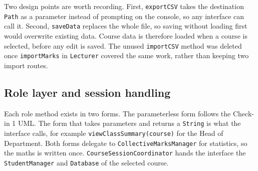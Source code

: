 Two design points are worth recording. First, \texttt{exportCSV} takes the destination \texttt{Path} as a parameter instead of prompting on the console, so any interface can call it. Second, \texttt{saveData} replaces the whole file, so saving without loading first would overwrite existing data. Course data is therefore loaded when a course is selected, before any edit is saved. The unused \texttt{importCSV} method was deleted once \texttt{importMarks} in \texttt{Lecturer} covered the same work, rather than keeping two import routes.

\subsection{Role layer and session handling}
Each role method exists in two forms. The parameterless form follows the Check-in 1 UML. The form that takes parameters and returns a \texttt{String} is what the interface calls, for example \texttt{viewClassSummary(course)} for the Head of Department. Both forms delegate to \texttt{CollectiveMarksManager} for statistics, so the maths is written once. \texttt{CourseSessionCoordinator} hands the interface the \texttt{StudentManager} and \texttt{Database} of the selected course.
